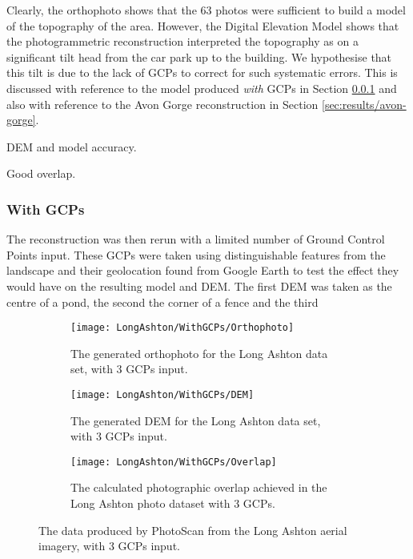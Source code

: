Clearly, the orthophoto shows that the 63 photos were sufficient to build a
model of the topography of the area. However, the Digital Elevation Model shows
that the photogrammetric reconstruction interpreted the topography as on a
significant tilt head from the car park up to the building. We hypothesise that
this tilt is due to the lack of GCPs to correct for such systematic errors. This
is discussed with reference to the model produced \textit{with} GCPs in Section
\ref{sec:results/long-ashton/wth-gcps} and also with reference to the Avon Gorge
reconstruction in Section \ref{sec:results/avon-gorge}.

DEM and model accuracy.

Good overlap.

\subsubsection{With GCPs}
\label{sec:results/long-ashton/wth-gcps}

The reconstruction was then rerun with a limited number of Ground Control Points
input. These GCPs were taken using distinguishable features from the landscape
and their geolocation found from Google Earth to test the effect they would have
on the resulting model and DEM. The first DEM was taken as the centre of a pond,
the second the corner of a fence and the third

\begin{figure}
    \centering
    \begin{subfigure}[b]{0.3\textwidth}
        \texttt{[image: LongAshton/WithGCPs/Orthophoto]}
        \caption{The generated orthophoto for the Long Ashton data set, with 3
        GCPs input.}
        \label{img:long-ashton/with-gcps/orthophoto}
    \end{subfigure}
    \begin{subfigure}[b]{0.3\textwidth}
        \texttt{[image: LongAshton/WithGCPs/DEM]}
        \caption{The generated DEM for the Long Ashton data set, with 3 GCPs
        input.}
        \label{img:long-ashton/with-gcps/dem}
    \end{subfigure}
    \begin{subfigure}[b]{0.3\textwidth}
        \texttt{[image: LongAshton/WithGCPs/Overlap]}
        \caption{The calculated photographic overlap achieved in the Long Ashton
        photo dataset with 3 GCPs.}
        \label{img:long-ashton/with-gcps/overlap}
    \end{subfigure}
    \caption{The data produced by PhotoScan from the Long Ashton aerial imagery,
    with 3 GCPs input.}
    \label{img:long-ashton/with-gcps}
\end{figure}

